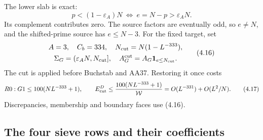 The lower slab is exact:
\[
 p<(1-\varepsilon_A)N
       \ \Longleftrightarrow\ e=N-p>\varepsilon_A N.
 \tag{4.15}
\]
Its complement contributes zero.
The source factors are eventually odd, so $e\ne N$, and the shifted-prime source has $e\le N-3$.
For the fixed target, set
\[
\begin{gathered}
 A=3,\quad C_b=334,\quad N_{\rm cut}=N(1-L^{-333}),\\
 \Sigma_G=(\varepsilon_A N,N_{\rm cut}],\quad
 A_G^{\rm cut}=A_G\mathbf1_{e\le N_{\rm cut}}.
\end{gathered}
 \tag{4.16}
\]
The cut is applied before Buchstab and AA37.
Restoring it once costs
\[
 R0:G1\le100(NL^{-333}+1),\qquad
 E^D_{\rm cut}\le{100(NL^{-333}+1)\over\mathcal W}
                  =O(L^{-331})+O(L^2/N).
 \tag{4.17}
\]
Discrepancies, membership and boundary faces use (4.16).
\subsection{The four sieve rows and their coefficients}

